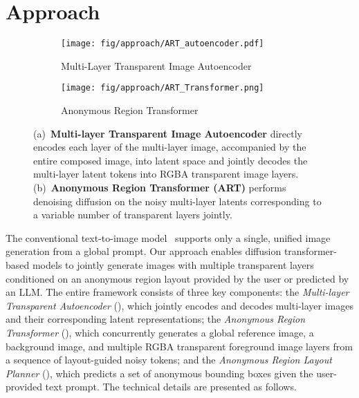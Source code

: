 \section{Approach}

\begin{figure*}[!t]
\begin{minipage}[!t]{1\linewidth}
\begin{subfigure}[b]{0.57\textwidth}
\centering
\texttt{[image: fig/approach/ART\_autoencoder.pdf]}
\vspace{-3mm}
\caption{Multi-Layer Transparent Image Autoencoder}
\label{fig:framework_a}
\end{subfigure}
\hfill
\begin{subfigure}[b]{0.39\textwidth}
\centering
\texttt{[image: fig/approach/ART\_Transformer.png]}
\vspace{-3mm}
\caption{\footnotesize{Anonymous Region Transformer}}
\label{fig:framework_b}
\end{subfigure}
\end{minipage}
\vspace{-2mm}
\caption{\footnotesize{
(a)~\textbf{Multi-layer Transparent Image Autoencoder} directly encodes each layer of the multi-layer image, accompanied by the entire composed image, into latent space and jointly decodes the multi-layer latent tokens into RGBA transparent image layers.
(b)~\textbf{Anonymous Region Transformer (ART)} performs denoising diffusion on the noisy multi-layer latents corresponding to a variable number of transparent layers jointly.
}}
\label{fig:framework}
\vspace{-2mm}
\end{figure*}

The conventional text-to-image model~\cite{podell2023sdxl,esser2024scaling,betker2023improving,saharia2022photorealistic, flux} supports only a single, unified image generation from a global prompt. Our approach enables diffusion transformer-based models to jointly generate images with multiple transparent layers conditioned on an anonymous region layout provided by the user or predicted by an LLM. The entire framework consists of three key components: the \emph{Multi-layer Transparent Autoencoder} (), which jointly encodes and decodes multi-layer images and their corresponding latent representations; the \emph{Anonymous Region Transformer} (), which concurrently generates a global reference image, a background image, and multiple RGBA transparent foreground image layers from a sequence of layout-guided noisy tokens; and the \emph{Anonymous Region Layout Planner} (), which predicts a set of anonymous bounding boxes given the user-provided text prompt. The technical details are presented as follows.

